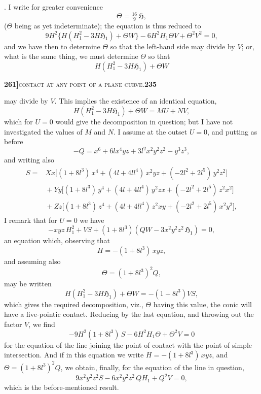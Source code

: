 \documentclass[11pt]{article}
\begin{document}
\medskip

. I write for greater convenience
\[
  \Theta = \tfrac{16}{9}\,\mathfrak{H},
\]
($\Theta$ being as yet indeterminate); the equation is thus reduced to
\[
  9 H^2 \bigl\{ H(H_1^2 - 3H \mathfrak{H}_1) + \Theta W \bigr\} - 6 H^2 H_1 \Theta V + \Theta^2 V^2 = 0,
\]
and we have then to determine $\Theta$ so that the left-hand side may divide by $V$; or, what is the same thing, we must determine $\Theta$ so that
\[
  H(H_1^2 - 3H \mathfrak{H}_1) + \Theta W
\]

\newpage
\noindent\textbf{261]}\hfill\textsc{contact at any point of a plane curve.}\hfill\textbf{235}

\medskip

\noindent may divide by $V$. This implies the existence of an identical equation,
\[
  H(H_1^2 - 3H \mathfrak{H}_1) + \Theta W = M U + N V,
\]
which for $U = 0$ would give the decomposition in question; but I have not investigated the values of $M$ and $N$. I assume at the outset $U = 0$, and putting as before
\[
  -Q = x^6 + 6lx^4 yz + 3l^2 x^2 y^2 z^2 - y^3 z^3,
\]
and writing also
\[
\begin{aligned}
  S ={}& Xx\bigl[(1 + 8l^3)\,x^4 + (4l + 4ll^4)\,x^2 yz + (-2l^2 + 2l^5)\,y^2 z^2\bigr]\\
       &{} + Yy\bigl[(1 + 8l^3)\,y^4 + (4l + 4ll^4)\,y^2 zx + (-2l^2 + 2l^5)\,z^2 x^2\bigr]\\
       &{} + Zz\bigl[(1 + 8l^3)\,z^4 + (4l + 4ll^4)\,z^2 xy + (-2l^2 + 2l^5)\,x^2 y^2\bigr],
\end{aligned}
\]
I remark that for $U = 0$ we have
\[
  -xyz\,H_1^2 + V S + (1 + 8l^3)(QW - 3x^2 y^2 z^2\,\mathfrak{H}_1) = 0,
\]
an equation which, observing that
\[
  H = -(1 + 8l^3)\,xyz,
\]
and assuming also
\[
  \Theta = (1 + 8l^3)^2 Q,
\]
may be written
\[
  H(H_1^2 - 3H \mathfrak{H}_1) + \Theta W = -(1 + 8l^3) V S,
\]
which gives the required decomposition, viz., $\Theta$ having this value, the conic will have a five-pointic contact. Reducing by the last equation, and throwing out the factor $V$, we find
\[
  -9H^2(1 + 8l^3)\,S - 6 H^2 H_1 \Theta + \Theta^2 V = 0
\]
for the equation of the line joining the point of contact with the point of simple intersection. And if in this equation we write $H = -(1 + 8l^3)\,xyz$, and $\Theta = (1 + 8l^3)^2 Q$, we obtain, finally, for the equation of the line in question,
\[
  9x^2 y^2 z^2 S - 6 x^2 y^2 z^2\,Q H_1 + Q^2 V = 0,
\]
which is the before-mentioned result.

\medskip
\end{document}
